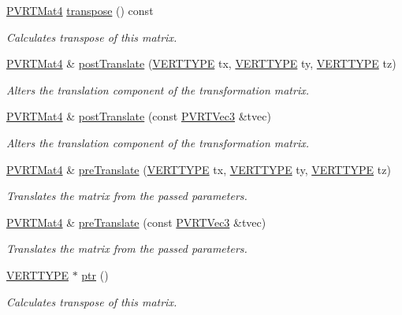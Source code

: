\begin{DoxyCompactItemize}
\hyperlink{struct_p_v_r_t_mat4}{P\+V\+R\+T\+Mat4} \hyperlink{struct_p_v_r_t_mat4_aca32d6ac4e141e825aba1ceead3b3a64}{transpose} () const 
\begin{DoxyCompactList}\small\item\em Calculates transpose of this matrix. \end{DoxyCompactList}\item 
\hyperlink{struct_p_v_r_t_mat4}{P\+V\+R\+T\+Mat4} \& \hyperlink{struct_p_v_r_t_mat4_a53a4cffcb0692d8c7d8bc180d8235a8d}{post\+Translate} (\hyperlink{group___a_p_i___o_g_l_e_s_ga06da457b7d3e93368ab904f89e1396be}{V\+E\+R\+T\+T\+Y\+P\+E} tx, \hyperlink{group___a_p_i___o_g_l_e_s_ga06da457b7d3e93368ab904f89e1396be}{V\+E\+R\+T\+T\+Y\+P\+E} ty, \hyperlink{group___a_p_i___o_g_l_e_s_ga06da457b7d3e93368ab904f89e1396be}{V\+E\+R\+T\+T\+Y\+P\+E} tz)
\begin{DoxyCompactList}\small\item\em Alters the translation component of the transformation matrix. \end{DoxyCompactList}\item 
\hyperlink{struct_p_v_r_t_mat4}{P\+V\+R\+T\+Mat4} \& \hyperlink{struct_p_v_r_t_mat4_a64eba736ccdd2faf2fe773f344932bbf}{post\+Translate} (const \hyperlink{struct_p_v_r_t_vec3}{P\+V\+R\+T\+Vec3} \&tvec)
\begin{DoxyCompactList}\small\item\em Alters the translation component of the transformation matrix. \end{DoxyCompactList}\item 
\hyperlink{struct_p_v_r_t_mat4}{P\+V\+R\+T\+Mat4} \& \hyperlink{struct_p_v_r_t_mat4_add888a273f7e8acbf4a9fbb566742105}{pre\+Translate} (\hyperlink{group___a_p_i___o_g_l_e_s_ga06da457b7d3e93368ab904f89e1396be}{V\+E\+R\+T\+T\+Y\+P\+E} tx, \hyperlink{group___a_p_i___o_g_l_e_s_ga06da457b7d3e93368ab904f89e1396be}{V\+E\+R\+T\+T\+Y\+P\+E} ty, \hyperlink{group___a_p_i___o_g_l_e_s_ga06da457b7d3e93368ab904f89e1396be}{V\+E\+R\+T\+T\+Y\+P\+E} tz)
\begin{DoxyCompactList}\small\item\em Translates the matrix from the passed parameters. \end{DoxyCompactList}\item 
\hyperlink{struct_p_v_r_t_mat4}{P\+V\+R\+T\+Mat4} \& \hyperlink{struct_p_v_r_t_mat4_a630532af3ea65d282080227814b3d811}{pre\+Translate} (const \hyperlink{struct_p_v_r_t_vec3}{P\+V\+R\+T\+Vec3} \&tvec)
\begin{DoxyCompactList}\small\item\em Translates the matrix from the passed parameters. \end{DoxyCompactList}\item 
\hyperlink{group___a_p_i___o_g_l_e_s_ga06da457b7d3e93368ab904f89e1396be}{V\+E\+R\+T\+T\+Y\+P\+E} $\ast$ \hyperlink{struct_p_v_r_t_mat4_a1bcd0a1b62fa95a853b32ce18429c366}{ptr} ()
\begin{DoxyCompactList}\small\item\em Calculates transpose of this matrix. \end{DoxyCompactList}\end{DoxyCompactItemize}
